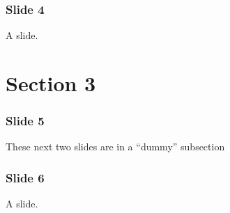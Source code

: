 \documentclass[t]{beamer}
\begin{document}
\begin{frame}[fragile]
\frametitle{Slide 4}


A slide.

\end{frame}


\section{Section 3%
  \label{section-3}%
}

\begin{frame}[fragile]
\frametitle{Slide 5}


These next two slides are in a ``dummy'' subsection

\end{frame}

\begin{frame}[fragile]
\frametitle{Slide 6}


A slide.

\end{frame}
\end{document}
